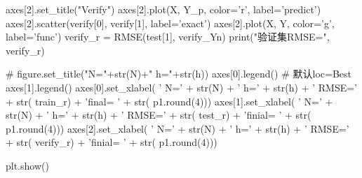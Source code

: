 \begin{python}
axes[2].set_title("Verify")
axes[2].plot(X, Y_p, color='r', label='predict')
axes[2].scatter(verify[0], verify[1], label='exact')
axes[2].plot(X, Y, color='g', label='func')
verify_r = RMSE(test[1], verify_Yn)
print("验证集RMSE=", verify_r)

# figure.set_title("N="+str(N)+" h="+str(h))
axes[0].legend()  # 默认loc=Best
axes[1].legend()
axes[0].set_xlabel(
    ' N=' + str(N) + ' h=' + str(h) + ' RMSE=' + str(
        train_r) + '\nparameter final= ' + str(
        p1.round(4)))
axes[1].set_xlabel(
    ' N=' + str(N) + ' h=' + str(h) + ' RMSE=' + str(
        test_r) + '\nparameter finial= ' + str(
        p1.round(4)))
axes[2].set_xlabel(
    ' N=' + str(N) + ' h=' + str(h) + ' RMSE=' + str(
        verify_r) + '\nparameter finial= ' + str(
        p1.round(4)))

plt.show()

\end{python}

